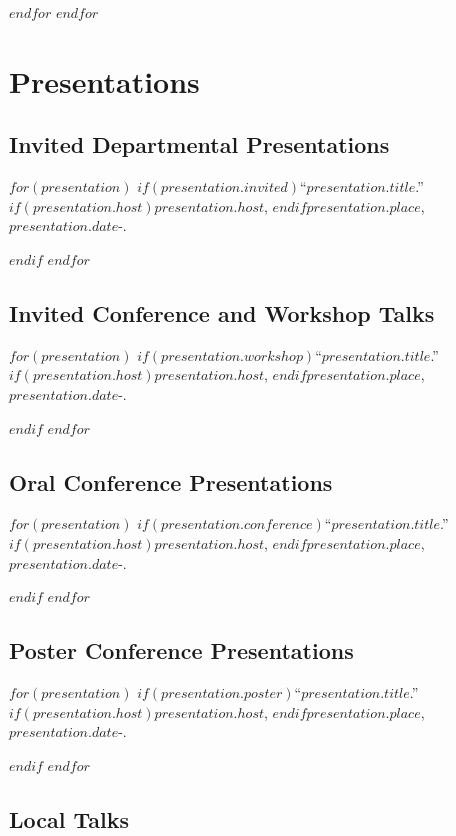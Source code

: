 \documentclass[11pt]{article}
\def\printdate#1{\xprintdate#1-}
\def\xprintdate#1-#2-#3-{#1}
\begin{document}
$endfor$
$endfor$

\section{Presentations}

\subsection{Invited Departmental Presentations}

$for(presentation)$
$if(presentation.invited)$\ind ``$presentation.title$.'' $if(presentation.host)$$presentation.host$, $endif$$presentation.place$, \printdate{$presentation.date$}.

$endif$
$endfor$

\subsection{Invited Conference and Workshop Talks}

$for(presentation)$
$if(presentation.workshop)$\ind ``$presentation.title$.'' $if(presentation.host)$\emph{$presentation.host$}, $endif$$presentation.place$, \printdate{$presentation.date$}.

$endif$
$endfor$

\subsection{Oral Conference Presentations}

$for(presentation)$
$if(presentation.conference)$\ind ``$presentation.title$.'' $if(presentation.host)$\emph{$presentation.host$}, $endif$$presentation.place$, \printdate{$presentation.date$}.

$endif$
$endfor$

\subsection{Poster Conference Presentations}

$for(presentation)$
$if(presentation.poster)$\ind ``$presentation.title$.'' $if(presentation.host)$\emph{$presentation.host$}, $endif$$presentation.place$, \printdate{$presentation.date$}.

$endif$
$endfor$

\subsection{Local Talks}
\end{document}
